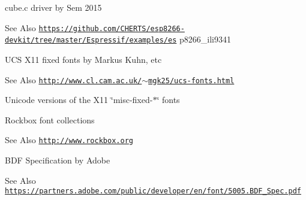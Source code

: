  \begin{DoxyParagraph}{cube.c driver by Sem 2015}

\end{DoxyParagraph}
\begin{DoxySeeAlso}{See Also}
\href{https://github.com/CHERTS/esp8266-devkit/tree/master/Espressif/examples/es}{\tt https\-://github.\-com/\-C\-H\-E\-R\-T\-S/esp8266-\/devkit/tree/master/\-Espressif/examples/es} p8266\-\_\-ili9341
\end{DoxySeeAlso}


 \begin{DoxyParagraph}{U\-C\-S X11 fixed fonts by Markus Kuhn, etc}

\end{DoxyParagraph}
\begin{DoxySeeAlso}{See Also}
\href{http://www.cl.cam.ac.uk/~mgk25/ucs-fonts.html}{\tt http\-://www.\-cl.\-cam.\-ac.\-uk/$\sim$mgk25/ucs-\/fonts.\-html}
\begin{DoxyItemize}
\item Unicode versions of the X11 \char`\"{}misc-\/fixed-\/$\ast$\char`\"{} fonts
\end{DoxyItemize}
\end{DoxySeeAlso}


 \begin{DoxyParagraph}{Rockbox font collections}

\end{DoxyParagraph}
\begin{DoxySeeAlso}{See Also}
\href{http://www.rockbox.org}{\tt http\-://www.\-rockbox.\-org}
\end{DoxySeeAlso}


 \begin{DoxyParagraph}{B\-D\-F Specification by Adobe}

\end{DoxyParagraph}
\begin{DoxySeeAlso}{See Also}
\href{https://partners.adobe.com/public/developer/en/font/5005.BDF_Spec.pdf}{\tt https\-://partners.\-adobe.\-com/public/developer/en/font/5005.\-B\-D\-F\-\_\-\-Spec.\-pdf} 
\end{DoxySeeAlso}
